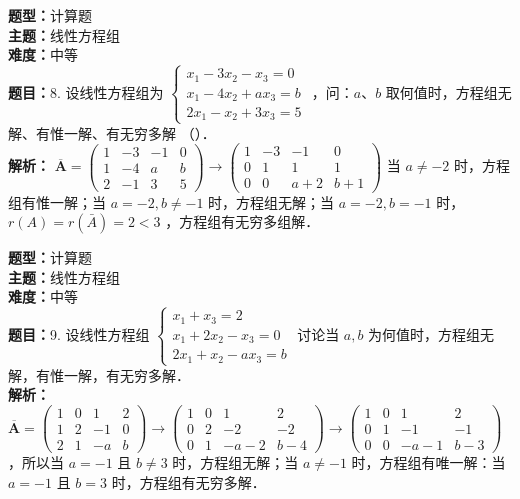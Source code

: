 \documentclass{ctexart}
\newenvironment{question}[5]{%
	\noindent\textbf{题型：}#1\\
	\textbf{主题：}#2\\
	\textbf{难度：}#3\\
	\textbf{题目：}#4\\
	\textbf{解析：}#5\\
	\vspace{1em}
}{}
\begin{document}
	
	\begin{question}
		{计算题}
		{线性方程组}
		{中等}
		{8. 设线性方程组为 \(\left\{\begin{array}{l}x_1-3 x_2-x_3=0 \\ x_1-4 x_2+a x_3=b \\ 2 x_1-x_2+3 x_3=5\end{array}\right.\) ，问：\(a 、 b\) 取何值时，方程组无解、有惟一解、有无穷多解 （）．}
		{ \(\overline{\mathbf{A}}=\left(\begin{array}{cccc}1 & -3 & -1 & 0 \\ 1 & -4 & a & b \\ 2 & -1 & 3 & 5\end{array}\right) \rightarrow\left(\begin{array}{cccc}1 & -3 & -1 & 0 \\ 0 & 1 & 1 & 1 \\ 0 & 0 & a+2 & b+1\end{array}\right)\) 当 \(a \neq-2\) 时，方程组有惟一解；当 \(a=-2, b \neq-1\) 时，方程组无解；当 \(a=-2, b=-1\) 时，\(r(A)=r(\bar{A})=2<3\) ，方程组有无穷多组解．}
	\end{question}
	
	\begin{question}
		{计算题}
		{线性方程组}
		{中等}
		{9. 设线性方程组 \(\left\{\begin{array}{r}x_1+x_3=2 \\ x_1+2 x_2-x_3=0 \\ 2 x_1+x_2-a x_3=b\end{array}\right.\) 讨论当 \(a, b\) 为何值时，方程组无解，有惟一解，有无穷多解．}
		{ \(\overline{\mathbf{A}}=\left(\begin{array}{cccc}1 & 0 & 1 & 2 \\ 1 & 2 & -1 & 0 \\ 2 & 1 & -a & b\end{array}\right) \rightarrow\left(\begin{array}{cccc}1 & 0 & 1 & 2 \\ 0 & 2 & -2 & -2 \\ 0 & 1 & -a-2 & b-4\end{array}\right) \rightarrow \left(\begin{array}{cccc}1 & 0 & 1 & 2 \\ 0 & 1 & -1 & -1 \\ 0 & 0 & -a-1 & b-3\end{array}\right)\) ，所以当 \(a=-1\) 且 \(b \neq 3\) 时，方程组无解；当 \(a \neq-1\) 时，方程组有唯一解：当 \(a=-1\) 且 \(b=3\) 时，方程组有无穷多解．}
	\end{question}
	
\end{document}
